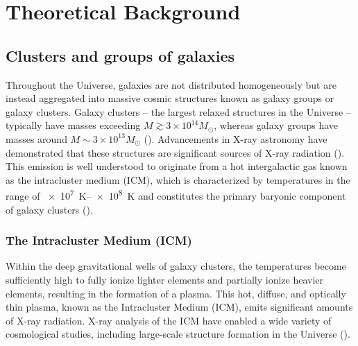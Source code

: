 
\chapter{Theoretical Background}
\label{sec:theoretical_background}
\section{Clusters and groups of galaxies}\label{sec:clusters}
Throughout the Universe, galaxies are not distributed homogeneously but are instead aggregated into massive cosmic structures known as galaxy groups or galaxy clusters. Galaxy clusters -- the largest relaxed structures in the Universe -- typically have masses exceeding \(M \gtrsim 3 \times 10^{14} M_{\odot}\), whereas galaxy groups have masses around \(M \sim 3 \times 10^{13} M_{\odot}\) (\cite{Schneider_2006}). Advancements in X-ray astronomy have demonstrated that these structures are significant sources of X-ray radiation (\cite{Cavaliere_1971}). This emission is well understood to originate from a hot intergalactic gas known as the intracluster medium (ICM), which is characterized by temperatures in the range of \SIrange{e7}{e8}{\kelvin} and constitutes the primary baryonic component of galaxy clusters (\cite{Schneider_2006}).
%
\subsection{The Intracluster Medium (ICM)}
Within the deep gravitational wells of galaxy clusters, the temperatures become sufficiently high to fully ionize lighter elements and partially ionize heavier elements, resulting in the formation of a plasma. This hot, diffuse, and optically thin plasma, known as the Intracluster Medium (ICM), emits significant amounts of X-ray radiation. X-ray analysis of the ICM have enabled a wide variety of cosmological studies, including large-scale structure formation in the Universe (\cite{KravtsovBorgani2012}).
%
